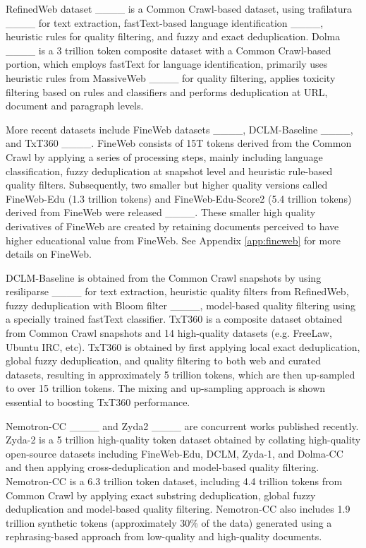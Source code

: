 RefinedWeb dataset ____ is a Common Crawl-based dataset, using trafilatura ____ for text extraction, fastText-based language identification ____, heuristic rules for quality filtering, and fuzzy and exact deduplication. Dolma ____ is a 3 trillion token composite dataset with a Common Crawl-based portion, which employs fastText for language identification, primarily uses heuristic rules from MassiveWeb ____ for quality filtering, applies toxicity filtering based on rules and classifiers and performs deduplication at URL, document and paragraph levels. 

More recent datasets include FineWeb datasets ____, DCLM-Baseline ____, and TxT360 ____. FineWeb consists of 15T tokens derived from the Common Crawl by applying a series of processing steps, mainly including language classification, fuzzy deduplication at snapshot level and heuristic rule-based quality filters. 
Subsequently, two smaller but higher quality versions called FineWeb-Edu (1.3 trillion tokens) and FineWeb-Edu-Score2 (5.4 trillion tokens) derived from FineWeb were released ____. These smaller high quality derivatives of FineWeb are created by retaining documents perceived to have higher educational value from FineWeb. See Appendix \ref{app:fineweb} for more details on FineWeb.

DCLM-Baseline is obtained from the Common Crawl snapshots by using resiliparse ____ for text extraction,  heuristic quality filters from RefinedWeb, fuzzy deduplication with Bloom filter ____, model-based quality filtering using a specially trained fastText classifier. TxT360 is a composite dataset obtained from Common Crawl snapshots and 14 high-quality datasets (e.g. FreeLaw, Ubuntu IRC, etc). TxT360 is obtained by first applying local exact deduplication, global fuzzy deduplication, and quality filtering to both web and curated datasets, resulting in approximately 5 trillion tokens, which are then up-sampled to over 15 trillion tokens. The mixing and up-sampling approach is shown essential to boosting TxT360 performance. 

Nemotron-CC ____ and Zyda2 ____ are concurrent works published recently. Zyda-2 is a 5 trillion high-quality token dataset obtained by collating high-quality open-source datasets including FineWeb-Edu, DCLM, Zyda-1, and Dolma-CC and then applying cross-deduplication and model-based quality filtering. Nemotron-CC is a 6.3 trillion token dataset, including 4.4 trillion tokens from Common Crawl by applying exact substring deduplication, global fuzzy deduplication and model-based quality filtering. Nemotron-CC also includes 1.9 trillion synthetic tokens (approximately 30\% of the data) generated using a rephrasing-based approach from low-quality and high-quality documents.


